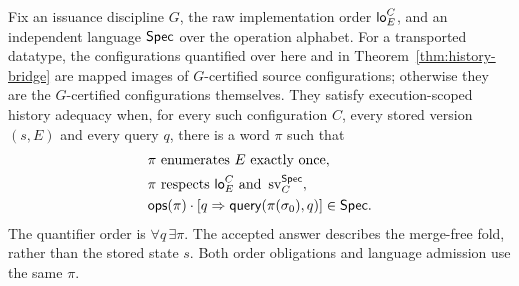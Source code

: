 \begin{definition}\label{def:history-adequacy}
Fix an issuance discipline $G$, the raw implementation order $\mathsf{lo}^{C}_{E}$,
and an independent language $\mathsf{Spec}$ over the operation alphabet.
For a transported datatype, the configurations quantified over here and in
Theorem~\ref{thm:history-bridge} are mapped images of $G$-certified source
configurations; otherwise they are the $G$-certified configurations themselves.
They satisfy execution-scoped history adequacy when, for every such
configuration $C$, every stored version $(s,E)$ and every query $q$,
there is a word $\pi$ such that
\begin{align*}
 &\pi\text{ enumerates }E\text{ exactly once},\\
 &\pi\text{ respects }\mathsf{lo}^{C}_{E}\text{ and }\operatorname{sv}^{\mathsf{Spec}}_C,\\
 &\mathsf{ops}(\pi)\cdot
   [q\Rightarrow\mathsf{query}(\pi(\sigma_0),q)]\in\mathsf{Spec}.
\end{align*}
The quantifier order is $\forall q\,\exists\pi$. The accepted answer describes the
merge-free fold, rather than the stored state $s$. Both order obligations and
language admission use the same $\pi$.
\end{definition}

